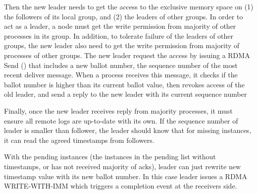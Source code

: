 Then the new leader needs to get the access to the exclusive memory space on (1)
the followers of its local group, and (2) the leaders of other groups. In order
to act as a leader, a node must get the write permission from majority of other
processes in its group. In addition, to tolerate failure of the leaders of other
groups, the new leader also need to get the write permission from majority of
processes of other groups. The new leader request the access by issuing a RDMA
Send () that includes a new ballot number, the
sequence number of the most recent deliver message. When a process receives this
message, it checks if the ballot number is higher than its current ballot value,
then revokes access of the old leader, and send a reply to the new leader with
its current sequence number

Finally, once the new leader receives reply from majority processes, it must
ensure all remote logs are up-to-date with its own. If the sequence number of
leader is smaller than follower, the leader should know that for missing
instances, it can read the agreed timestamps from followers.

With the pending instances (the instances in the pending list without
timestamps, or has not received majority of acks), leader can just rewrite new
timestamp value with its new ballot number. In this case leader issues a RDMA
WRITE-WITH-IMM which triggers a completion event at the receivers side.



